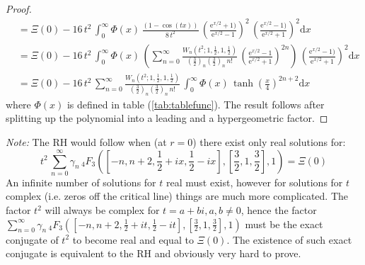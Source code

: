 \documentclass[a4paper,11pt,twoside]{amsart}
\begin{document}
\begin{proof}
\begin{align}
  &=\Xi(0)- 16\,t^2\, \int_{0}^\infty \Phi(x)\, \frac{(1-\cos(tx))}{8\,t^2}\,\left(\frac{\textrm{e}^{x/2}+1)}{\textrm{e}^{x/2}-1}\right)^2\,\left(\frac{\textrm{e}^{x/2}-1)}{\textrm{e}^{x/2}+1}\right)^2 \mathrm{d}x\\
  &=\Xi(0)- 16\,t^2\, \int_{0}^\infty \Phi(x)\,\left(\sum_{n=0}^\infty\frac{W_n\left(t^2;1,\frac12,1,\frac12\right)}{\left(\frac32\right)_n\left(\frac32\right)_n\,n!}\, \left(\frac{\textrm{e}^{x/2}-1}{\textrm{e}^{x/2}+1}\right)^{2n}\right)\,\left(\frac{\textrm{e}^{x/2}-1)}{\textrm{e}^{x/2}+1}\right)^2 \mathrm{d}x \\
  &=\Xi(0)- 16\,t^2\, \sum_{n=0}^\infty \frac{W_n\left(t^2;1,\frac12,1,\frac12\right)}{\left(\frac32\right)_n\left(\frac32\right)_n\,n!}\,\int_{0}^\infty \Phi(x)\,\tanh\left(\frac{x}{4}\right)^{2n+2} \mathrm{d}x
\end{align}
where $\Phi(x)$ is defined in table (\ref{tab:tablefunc}). The result follows after splitting up the polynomial into a leading and a hypergeometric factor.
\end{proof} 
\textit{Note:} The RH would follow when (at $r=0$) there exist only real solutions for:
\begin{equation}
  t^2\,\sum_{n=0}^{\infty} \gamma_n\, {}_4F_3\left(\left[-n, n+2,\frac12+ix, \frac12- ix\right],\left[\frac32, 1, \frac32\right], 1\right) = \Xi(0)
\end{equation}
An infinite number of solutions for $t$ real must exist, however for solutions for $t$ complex (i.e. zeros off the critical line) things are much more complicated. The factor $t^2$ will always be complex for $t=a+bi, a,b \ne 0$, hence the factor $\sum_{n=0}^{\infty} \gamma_n\, {}_4F_3\left(\left[-n, n+2,\frac12+it, \frac12- it\right],\left[\frac32, 1, \frac32\right], 1\right)$ must be the exact conjugate of $t^2$ to become real and equal to $\Xi(0)$. The existence of such exact conjugate is equivalent to the RH and obviously very hard to prove. 
\end{document}

